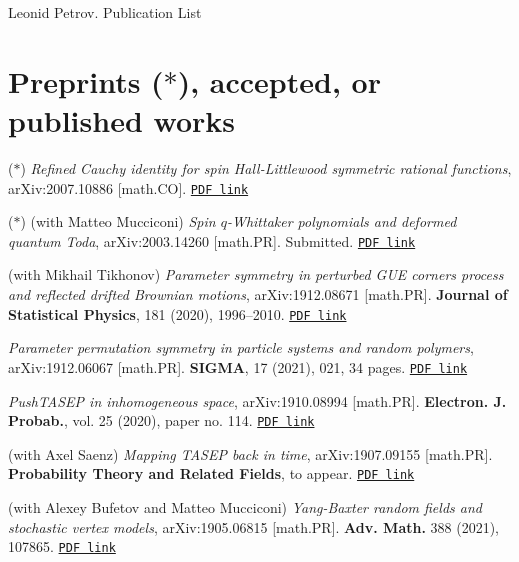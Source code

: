 \documentclass[letterpaper,11pt]{article}
\begin{document}
{\huge Leonid Petrov. Publication List}


\bigskip
\bigskip

\section*{Preprints ($*$), accepted, or published works}

\begin{etaremune}
	\renewcommand{\labelenumi}{[\theenumi]}
	\item ($*$)
		\emph{Refined Cauchy identity for spin Hall-Littlewood symmetric rational functions},
		arXiv:2007.10886 [math.CO].
		\href{https://storage.lpetrov.cc/research_files/Petrov-publ/37-publ-petrov-uva.pdf}{\texttt{PDF link}}	
	\item ($*$)
		(with Matteo Mucciconi)
		\emph{Spin $q$-Whittaker polynomials and deformed quantum Toda},
		arXiv:2003.14260 [math.PR]. Submitted.
		\href{https://storage.lpetrov.cc/research_files/Petrov-publ/36-publ-petrov-uva.pdf}{\texttt{PDF link}}	
	\item 
		(with Mikhail Tikhonov)
		\emph{Parameter symmetry in perturbed GUE corners process and reflected drifted Brownian motions},
		arXiv:1912.08671 [math.PR]. 
		\textbf{Journal of Statistical Physics}, 181 (2020), 1996–2010.
		\href{https://storage.lpetrov.cc/research_files/Petrov-publ/35-publ-petrov-uva.pdf}{\texttt{PDF link}}	
	\item 
		\emph{Parameter permutation symmetry in particle systems and random polymers},
		arXiv:1912.06067 [math.PR]. \textbf{SIGMA}, 17 (2021), 021, 34 pages.
		\href{https://storage.lpetrov.cc/research_files/Petrov-publ/34-publ-petrov-uva.pdf}{\texttt{PDF link}}	
	\item
		\emph{PushTASEP in inhomogeneous space},
		arXiv:1910.08994 [math.PR]. \textbf{Electron. J. Probab.}, vol. 25 (2020), paper no. 114.
		\href{https://storage.lpetrov.cc/research_files/Petrov-publ/33-publ-petrov-uva.pdf}{\texttt{PDF link}}	
	\item 
		(with Axel Saenz)
		\emph{Mapping TASEP back in time},
		arXiv:1907.09155 [math.PR].
		\textbf{Probability Theory and Related Fields}, to appear.
		\href{https://storage.lpetrov.cc/research_files/Petrov-publ/32-publ-petrov-uva.pdf}{\texttt{PDF link}}	
\item 
	(with Alexey Bufetov and Matteo Mucciconi)
	\emph{Yang-Baxter random fields and stochastic vertex models},
	arXiv:1905.06815 [math.PR].
	\textbf{Adv. Math.} 388 (2021), 107865.
	\href{https://storage.lpetrov.cc/research_files/Petrov-publ/31-publ-petrov-uva.pdf}{\texttt{PDF link}}	

\end{etaremune}
\end{document}
